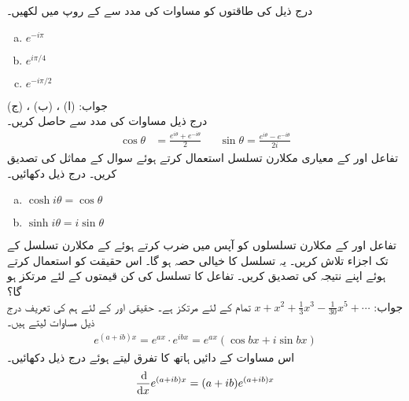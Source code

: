درج ذیل  کی طاقتوں کو مساوات  کی مدد سے  کے روپ میں لکھیں۔
\begin{multicols}{3}
\begin{enumerate}[a.]
\item
$e^{-i\pi}$
\item
$e^{i\pi/4}$
\item
$e^{-i\pi/2}$
\end{enumerate}
\end{multicols}
جواب:\quad
(ا) ، (ب) ، (ج) 
\\
درج ذیل مساوات  کی مدد سے حاصل کریں۔
\begin{align*}
\cos \theta&=\frac{e^{i\theta}+e^{-i\theta}}{2} && \sin \theta=\frac{e^{i\theta}-e^{-i\theta}}{2i}
\end{align*}
تفاعل  اور  کے معیاری مکلارن تسلسل استعمال کرتے ہوئے سوال  کے مماثل کی تصدیق کریں۔
درج ذیل دکھائیں۔
\begin{multicols}{2}
\begin{enumerate}[a.]
\item
$\cosh i\theta=\cos \theta$
\item
$\sinh i\theta=i\sin \theta$
\end{enumerate}
\end{multicols}
تفاعل  اور  کے مکلارن تسلسلوں کو آپس میں ضرب کرتے ہوئے  کے مکلارن تسلسل کے  تک اجزاء تلاش کریں۔ یہ تسلسل  کا خیالی حصہ ہو گا۔ اس حقیقت کو استعمال کرتے ہوئے اپنے نتیجہ کی تصدیق کریں۔ تفاعل  کا تسلسل  کی کن قیمتوں کے لئے مرتکز ہو گا؟\\
جواب:\quad
$x+x^2+\tfrac{1}{3}x^3-\tfrac{1}{30}x^5+\cdots$\quad\quad
تمام  کے لئے مرتکز ہے۔
حقیقی  اور  کے لئے ہم  کی تعریف درج ذیل مساوات لیتے ہیں۔
\begin{align*}
e^{(a+ib)x}=e^{ax}\cdot e^{ibx}=e^{ax}(\cos bx+i\sin bx)
\end{align*}
اس مساوات کے دائیں ہاتھ کا تفرق لیتے ہوئے درج ذیل دکھائیں۔
\begin{align*}
\frac{\dif}{\dif x}e^{(a+ib)x}=(a+ib)e^{(a+ib)x}
\end{align*} 
